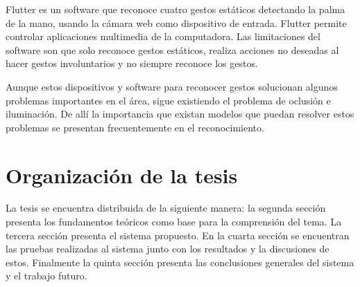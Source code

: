 Flutter  es un software que reconoce cuatro gestos est\'aticos detectando la palma de la mano, usando la c\'amara web como dispositivo de entrada. Flutter permite controlar aplicaciones multimedia de la computadora. 	Las limitaciones del software son que solo reconoce gestos est\'aticos, realiza acciones no deseadas al hacer gestos involuntarios y no siempre reconoce los gestos. 

Aunque estos dispositivos y software para reconocer gestos  solucionan algunos problemas importantes en el \'area, sigue existiendo el problema de oclusi\'on  e iluminaci\'on. De allí la importancia que existan modelos que puedan resolver estos problemas se presentan frecuentemente en el reconocimiento. 

\section{Organizaci\'on de la tesis}\label{sec:OrganizacionTesis}
La tesis se encuentra distribuida de la siguiente manera: la segunda sección presenta los fundamentos teóricos como base para la comprensión del tema. La tercera sección presenta el sistema propuesto. En la cuarta sección se encuentran las pruebas realizadas al sistema junto con los resultados y la discusiones de estos. Finalmente la quinta sección presenta las conclusiones generales del sistema y el trabajo futuro. 
	



\newpage









